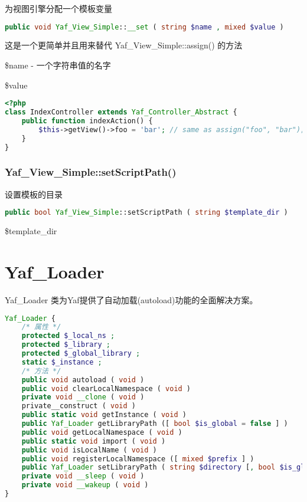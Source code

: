 为视图引擎分配一个模板变量

\begin{lstlisting}[language=PHP]
public void Yaf_View_Simple::__set ( string $name , mixed $value )
\end{lstlisting}


这是一个更简单并且用来替代 Yaf\_View\_Simple::assign() 的方法

\begin{compactitem}
\item \$name - 一个字符串值的名字

\item \$value

\end{compactitem}

\begin{lstlisting}[language=PHP]
<?php
class IndexController extends Yaf_Controller_Abstract {
    public function indexAction() {
        $this->getView()->foo = 'bar'; // same as assign("foo", "bar");
    }
}
\end{lstlisting}

\subsection{Yaf\_View\_Simple::setScriptPath()}

设置模板的目录

\begin{lstlisting}[language=PHP]
public bool Yaf_View_Simple::setScriptPath ( string $template_dir )
\end{lstlisting}


\begin{compactitem}
\item \$template\_dir
\end{compactitem}


\chapter{Yaf\_Loader}

Yaf\_Loader 类为Yaf提供了自动加载(autoload)功能的全面解决方案。

\begin{lstlisting}[language=PHP]
Yaf_Loader {
    /* 属性 */
    protected $_local_ns ;
    protected $_library ;
    protected $_global_library ;
    static $_instance ;
    /* 方法 */
    public void autoload ( void )
    public void clearLocalNamespace ( void )
    private void __clone ( void )
    private__construct ( void )
    public static void getInstance ( void )
    public Yaf_Loader getLibraryPath ([ bool $is_global = false ] )
    public void getLocalNamespace ( void )
    public static void import ( void )
    public void isLocalName ( void )
    public void registerLocalNamespace ([ mixed $prefix ] )
    public Yaf_Loader setLibraryPath ( string $directory [, bool $is_global = false ] )
    private void __sleep ( void )
    private void __wakeup ( void )
}
\end{lstlisting}


